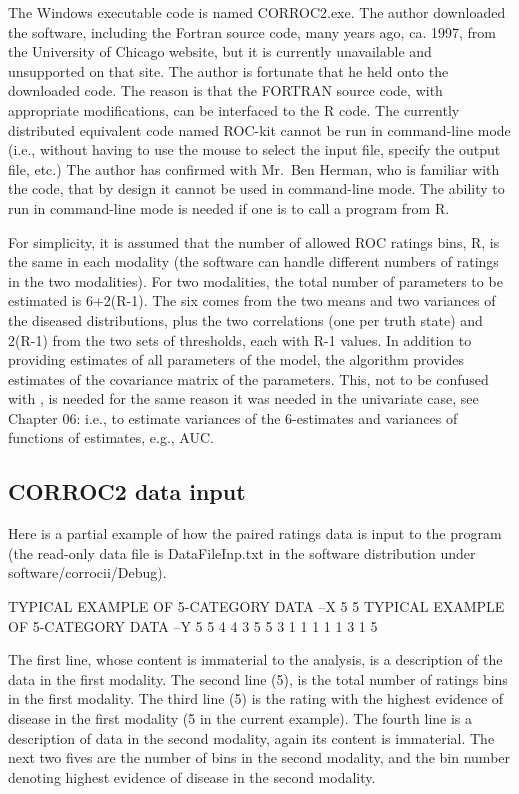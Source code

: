 \documentclass[
]{book}
\begin{document}
The Windows executable code is named CORROC2.exe. The author downloaded the software, including the Fortran source code, many years ago, ca. 1997, from the University of Chicago website, but it is currently unavailable and unsupported on that site. The author is fortunate that he held onto the downloaded code. The reason is that the FORTRAN source code, with appropriate modifications, can be interfaced to the R code. The currently distributed equivalent code named ROC-kit cannot be run in command-line mode (i.e., without having to use the mouse to select the input file, specify the output file, etc.) The author has confirmed with Mr.~Ben Herman, who is familiar with the code, that by design it cannot be used in command-line mode. The ability to run in command-line mode is needed if one is to call a program from R.

For simplicity, it is assumed that the number of allowed ROC ratings bins, R, is the same in each modality (the software can handle different numbers of ratings in the two modalities). For two modalities, the total number of parameters to be estimated is 6+2(R-1). The six comes from the two means and two variances of the diseased distributions, plus the two correlations (one per truth state) and 2(R-1) from the two sets of thresholds, each with R-1 values. In addition to providing estimates of all parameters of the model, the algorithm provides estimates of the covariance matrix of the parameters. This, not to be confused with , is needed for the same reason it was needed in the univariate case, see Chapter 06: i.e., to estimate variances of the 6-estimates and variances of functions of estimates, e.g., AUC.

\hypertarget{bivariate-binormal-model-corroc2-data-input}{%
\subsection{CORROC2 data input}\label{bivariate-binormal-model-corroc2-data-input}}

Here is a partial example of how the paired ratings data is input to the program (the read-only data file is DataFileInp.txt in the software distribution under software/corrocii/Debug).

TYPICAL EXAMPLE OF 5-CATEGORY DATA --X
5
5
TYPICAL EXAMPLE OF 5-CATEGORY DATA --Y
5
5
4 4
3 5
5 3
1 1
1 1
1 3
1 5

The first line, whose content is immaterial to the analysis, is a description of the data in the first modality. The second line (5), is the total number of ratings bins in the first modality. The third line (5) is the rating with the highest evidence of disease in the first modality (5 in the current example). The fourth line is a description of data in the second modality, again its content is immaterial. The next two fives are the number of bins in the second modality, and the bin number denoting highest evidence of disease in the second modality.
\end{document}
